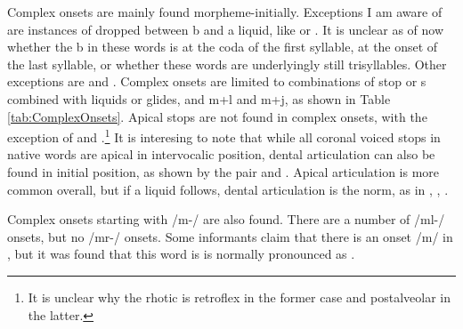 Complex onsets are mainly found morpheme-initially. Exceptions I am aware of are instances of \E{} dropped between b and a liquid, like  or . It is unclear as of now whether the b in these words is at the coda of the first syllable, at the onset of the last syllable, or whether these words are underlyingly still trisyllables. Other exceptions are   and .
Complex onsets are limited to  combinations of stop or s combined with liquids or glides,  and m+l and m+j, as shown in Table \ref{tab:ComplexOnsets}. Apical stops are not found in complex onsets, with the exception of  and .\footnote{It is unclear why the rhotic is retroflex in the former case and postalveolar in the latter.} It is interesing to note that while all coronal voiced stops in native words are apical in intervocalic position, dental articulation can also be found in initial position, as shown by the pair  and . Apical articulation is more common overall, but if a liquid follows, dental articulation is the norm, as in , , .

Complex onsets starting with /m-/ are also found. There are a number of /ml-/ onsets, but no /mr-/ onsets. Some informants claim that there is an onset /m\ny/ in , but it was found that this word is is normally pronounced as .

